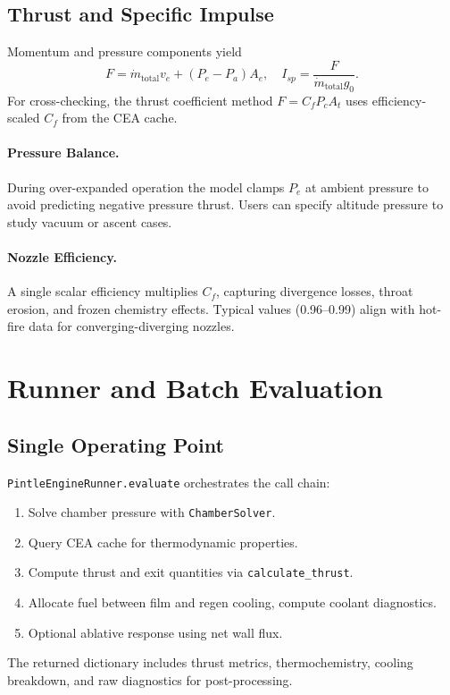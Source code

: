 \documentclass[12pt]{article}
\begin{document}
\subsection{Thrust and Specific Impulse}
Momentum and pressure components yield
\[
F = \dot{m}_{\text{total}} v_e + (P_e - P_a) A_e,
\quad
I_{sp} = \frac{F}{\dot{m}_{\text{total}} g_0}.
\]
For cross-checking, the thrust coefficient method $F = C_f P_c A_t$ uses efficiency-scaled $C_f$ from the CEA cache.

\paragraph{Pressure Balance.}  During over-expanded operation the model clamps $P_e$ at ambient pressure to avoid predicting negative pressure thrust.  Users can specify altitude pressure to study vacuum or ascent cases.

\paragraph{Nozzle Efficiency.}  A single scalar efficiency multiplies $C_f$, capturing divergence losses, throat erosion, and frozen chemistry effects.  Typical values (0.96--0.99) align with hot-fire data for converging-diverging nozzles.

\section{Runner and Batch Evaluation}

\subsection{Single Operating Point}
\verb|PintleEngineRunner.evaluate| orchestrates the call chain:
\begin{enumerate}
    \item Solve chamber pressure with \verb|ChamberSolver|.
    \item Query CEA cache for thermodynamic properties.
    \item Compute thrust and exit quantities via \verb|calculate_thrust|.
    \item Allocate fuel between film and regen cooling, compute coolant diagnostics.
    \item Optional ablative response using net wall flux.
\end{enumerate}
The returned dictionary includes thrust metrics, thermochemistry, cooling breakdown, and raw diagnostics for post-processing.
\end{document}
